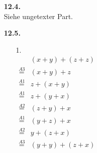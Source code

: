 \documentclass[a4paper,11pt,fleqn]{scrartcl}
\begin{document}
\begin{enumerate}
\begin{enumerate}
\begin{tabular}{ccc}
\begin{tikzpicture}[>=stealth',
									shorten >=1pt,
									auto,
									node distance=2.5cm,
									every path/.style={->},
									every state/.style={circle, draw, minimum size = 0.75cm}]
				\end{tikzpicture}				
			\end{tabular} \\ \\
			\item[2.] \quad \\
			\begin{tabular}{ccccc}
				\(
				\begin{array}{ccc}
					\text{d} & \overset{\wedge}{=} & 1 \\
					\text{e} & \overset{\wedge}{=} & 3 \\
					\text{f} & \overset{\wedge}{=} & 4
				\end{array}
				\)
				&\quad \quad \quad &
				\(
				\begin{array}{ccc}
					\text{g} & \overset{\wedge}{=} & 5 \\
					\text{h} & \overset{\wedge}{=} & 4 \\
					\text{i} & \overset{\wedge}{=} & 5 
				\end{array}
				\)
				&\quad \quad \quad &
				\(
				\begin{array}{ccc}
					\text{j} & \overset{\wedge}{=} & 7 \\
					\text{k} & \overset{\wedge}{=} & 6 \\
					\text{k} & \overset{\wedge}{=} & 2 
				\end{array}
				\)
			\end{tabular}
			\item[3.] \quad \\
				Da alle Knoten eine Entsprechung aufweisen sind die Graphen bisimilar.
			
		\end{enumerate}
		\item[\textbf{12.4.}] \quad \\
		Siehe ungetexter Part. \\
		\item[\textbf{12.5.}]
		\begin{enumerate}
			\item[1.] \quad \\
			\(
			\begin{array}{cl}
				& (x + y) + (z + z) \\
				\overset{A3}{=} & (x + y) + z \\
				\overset{A1}{=} & z + (x + y) \\
				\overset{A1}{=} & z + (y + x) \\
				\overset{A2}{=} & (z + y) + x \\
				\overset{A1}{=} & (y + z) + x \\
				\overset{A2}{=} & y + (z + x) \\				
				\overset{A3}{=} & (y + y) + (z + x)
			\end{array}
			\)
			

\end{enumerate}
\end{enumerate}
\end{document}
